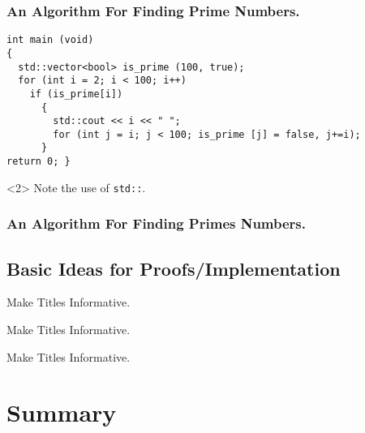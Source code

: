 \documentclass[aspectratio=169]{beamer}
\begin{document}
{\begin{frame}[fragile]
  \frametitle{An Algorithm For Finding Prime Numbers.}
\begin{verbatim}
int main (void)
{
  std::vector<bool> is_prime (100, true);
  for (int i = 2; i < 100; i++)
    if (is_prime[i])
      {
        std::cout << i << " ";
        for (int j = i; j < 100; is_prime [j] = false, j+=i);
      }
return 0; }
\end{verbatim}
  \begin{uncoverenv}<2>
    Note the use of \verb|std::|.
  \end{uncoverenv}
\end{frame}


\begin{frame}[fragile]
  \frametitle{An Algorithm For Finding Primes Numbers.}
\begin{semiverbatim}
\end{semiverbatim}
\end{frame}


\subsection{Basic Ideas for Proofs/Implementation}

\begin{frame}{Make Titles Informative.}
\end{frame}

\begin{frame}{Make Titles Informative.}
\end{frame}

\begin{frame}{Make Titles Informative.}
\end{frame}



\section*{Summary}

}
\end{document}
